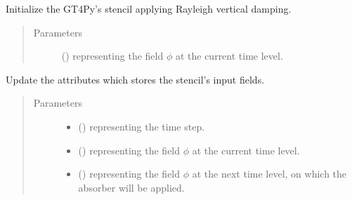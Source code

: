 \documentclass[letterpaper,10pt,english]{sphinxmanual}
\begin{document}
\begin{fulllineitems}

\begin{fulllineitems}
\label{\detokenize{api:dycore.vertical_damping.VerticalDampingRayleigh._stencil_initialize}}
Initialize the GT4Py’s stencil applying Rayleigh vertical damping.
\begin{quote}\begin{description}
\item[{Parameters}] \leavevmode
{} () \textendash{}  representing the field \(\phi\) at the current time level.

\end{description}\end{quote}

\end{fulllineitems}


\begin{fulllineitems}
\label{\detokenize{api:dycore.vertical_damping.VerticalDampingRayleigh._stencil_set_inputs}}
Update the attributes which stores the stencil’s input fields.
\begin{quote}\begin{description}
\item[{Parameters}] \leavevmode\begin{itemize}
\item {} 
 () \textendash{}  representing the time step.

\item {} 
 () \textendash{}  representing the field \(\phi\) at the current time level.

\item {} 
 () \textendash{}  representing the field \(\phi\) at the next time level, on
which the absorber will be applied.


\end{itemize}
\end{description}
\end{quote}
\end{fulllineitems}
\end{fulllineitems}
\end{document}
